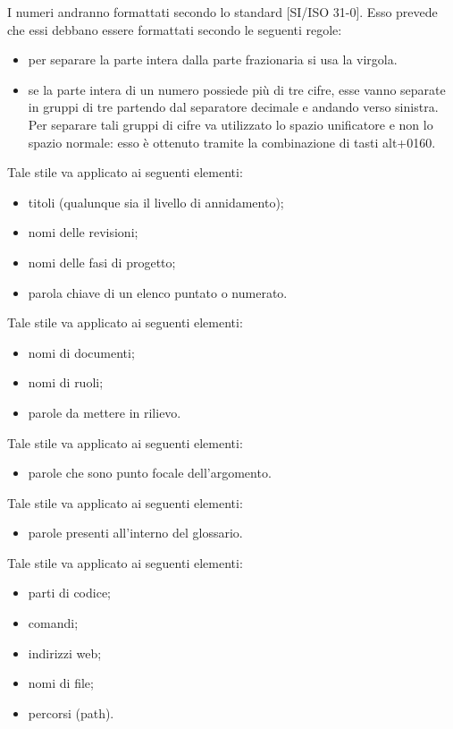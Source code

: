 					I numeri andranno formattati secondo lo standard [SI/ISO 31-0]. Esso prevede che essi debbano essere formattati secondo le seguenti regole:
					\begin{itemize}
						\item per separare la parte intera dalla parte frazionaria si usa la virgola.
						\item se la parte intera di un numero possiede più di tre cifre, esse vanno separate in gruppi di tre partendo dal separatore decimale e andando verso sinistra. Per separare tali gruppi di cifre va utilizzato lo spazio unificatore e non lo spazio normale: esso è ottenuto tramite la combinazione di tasti alt+0160.
					\end{itemize}
					Tale stile va applicato ai seguenti elementi:
					\begin{itemize}
						\item titoli (qualunque sia il livello di annidamento);
						\item nomi delle revisioni;
						\item nomi delle fasi di progetto;
						\item parola chiave di un elenco puntato o numerato.
					\end{itemize}
					Tale stile va applicato ai seguenti elementi:
					\begin{itemize}
						\item nomi di documenti;
						\item nomi di ruoli;
						\item parole da mettere in rilievo.
					\end{itemize}
					Tale stile va applicato ai seguenti elementi:
					\begin{itemize}
						\item parole che sono punto focale dell’argomento.
					\end{itemize}
					Tale stile va applicato ai seguenti elementi:
					\begin{itemize}
						\item parole presenti all’interno del glossario.
					\end{itemize}
					Tale stile va applicato ai seguenti elementi:
					\begin{itemize}
						\item parti di codice;
						\item comandi;
						\item indirizzi web;
						\item nomi di file;
						\item percorsi (path).
					\end{itemize}

